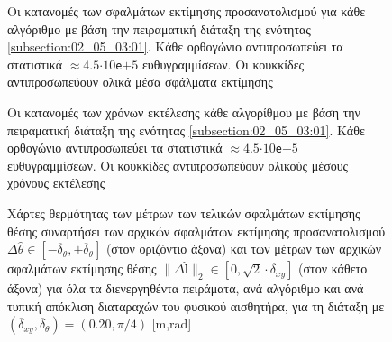 \begin{figure}\vspace{1cm}\hspace{0.5cm}
  
  \vspace{-4cm}
  \caption{\small Οι κατανομές των σφαλμάτων εκτίμησης προσανατολισμού για κάθε
           αλγόριθμο με βάση την πειραματική διάταξη της ενότητας
           \ref{subsection:02_05_03:01}. Κάθε ορθογώνιο αντιπροσωπεύει τα
           στατιστικά $\approx 4.5$$\cdot$$10$\texttt{e}$+$$5$ ευθυγραμμίσεων.
           Οι κουκκίδες αντιπροσωπεύουν ολικά μέσα σφάλματα εκτίμησης}
  \label{fig:02_05_03:02:02}
\end{figure}

\begin{figure}\vspace{1cm}\hspace{0.5cm}
  
  \vspace{-4cm}
  \caption{\small Οι κατανομές των χρόνων εκτέλεσης κάθε
           αλγορίθμου με βάση την πειραματική διάταξη της ενότητας
           \ref{subsection:02_05_03:01}. Κάθε ορθογώνιο αντιπροσωπεύει τα
           στατιστικά $\approx 4.5$$\cdot$$10$\texttt{e}$+$$5$ ευθυγραμμίσεων.
           Οι κουκκίδες αντιπροσωπεύουν ολικούς μέσους χρόνους εκτέλεσης}
  \label{fig:02_05_03:02:03}
\end{figure}

\begin{figure}\vspace{1cm}\hspace{0.5cm}
  
  \vspace{1cm}
  \caption{\small Χάρτες θερμότητας των μέτρων των τελικών σφαλμάτων εκτίμησης
           θέσης συναρτήσει των αρχικών σφαλμάτων εκτίμησης προσανατολισμού
           $\Delta\hat{\theta} \in
           [-\overline{\delta}_{\theta},+\overline{\delta}_{\theta}]$ (στον
           οριζόντιο άξονα) και των μέτρων των αρχικών σφαλμάτων εκτίμησης
           θέσης $\|\Delta \hat{\bm{l}}\|_2 \in [0, \sqrt{2}\cdot
           \overline{\delta}_{xy}]$ (στον κάθετο άξονα) για όλα τα
           διενεργηθέντα πειράματα, ανά αλγόριθμο και ανά τυπική απόκλιση
           διαταραχών του φυσικού αισθητήρα, για τη διάταξη με
           $(\overline{\delta}_{xy}, \overline{\delta}_{\theta}) = (0.20,
           \pi/4)$ [m,rad]}
  \label{fig:02_05_03:02:04}
\end{figure}


